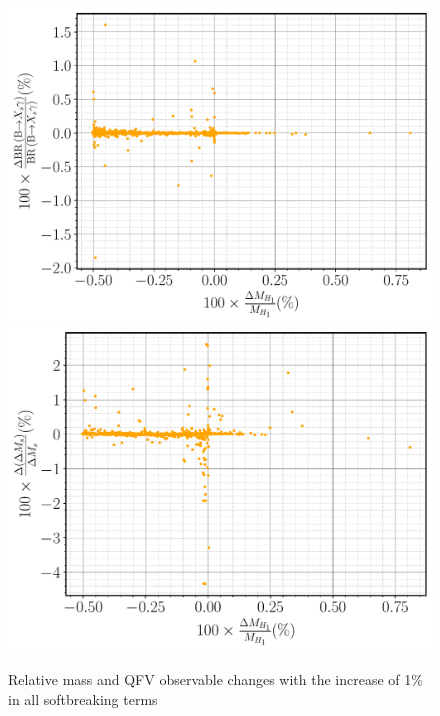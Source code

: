 \documentclass[10pt]{book}
\renewcommand{\(}{\left(}
\renewcommand{\)}{\right)}
\renewcommand{\[}{\left[}
\renewcommand{\]}{\right]}
\begin{document}
\begin{figure}[H]
	\centering
	\includegraphics[width=.49\textwidth]{Images/3HDM/Fine_Tuning/Xsgamma_H1.pdf}
    \includegraphics[width=.49\textwidth]{Images/3HDM/Fine_Tuning/DeltaMs_H1.pdf}
	\caption{Relative mass and QFV observable changes with the increase of 1\% in all softbreaking terms}
	\label{fig:3HDM_Fine_Tunning}
\end{figure}	
\end{document}
